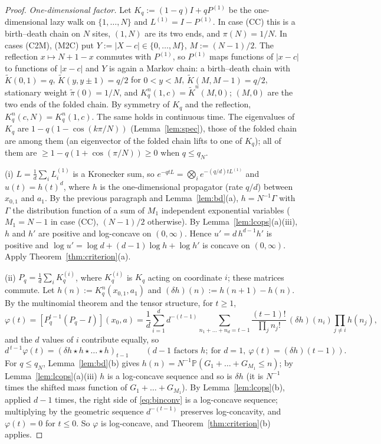 \documentclass[11pt,a4paper]{article}
\theoremstyle{definition}
\newcommand{\Prob}{\mathbb P}
\begin{document}
\begin{proof}
\emph{One-dimensional factor.} Let $K_q:=(1-q)I+qP^{(1)}$ be the one-dimensional lazy walk on $\{1,\dots,N\}$ and $L^{(1)}=I-P^{(1)}$. In case (CC) this is a birth--death chain on $N$ sites, $(1,N)$ are its two ends, and $\pi(N)=1/N$. In cases (C2M), (M2C) put $Y:=|X-c|\in\{0,\dots,M\}$, $M:=(N-1)/2$. The reflection $x\mapsto N+1-x$ commutes with $P^{(1)}$, so $P^{(1)}$ maps functions of $|x-c|$ to functions of $|x-c|$ and $Y$ is again a Markov chain: a birth--death chain with $\tilde K(0,1)=q$, $\tilde K(y,y\pm1)=q/2$ for $0<y<M$, $\tilde K(M,M-1)=q/2$, stationary weight $\tilde\pi(0)=1/N$, and $K_q^n(1,c)=\tilde K^n(M,0)$; $(M,0)$ are the two ends of the folded chain. By symmetry of $K_q$ and the reflection, $K_q^n(c,N)=K_q^n(1,c)$. The same holds in continuous time. The eigenvalues of $K_q$ are $1-q(1-\cos(k\pi/N))$ (Lemma~\ref{lem:spec}), those of the folded chain are among them (an eigenvector of the folded chain lifts to one of $K_q$); all of them are $\ge1-q(1+\cos(\pi/N))\ge0$ when $q\le q_N$.

(i) $L=\frac1d\sum_iL^{(1)}_i$ is a Kronecker sum, so $e^{-qtL}=\bigotimes_ie^{-(q/d)tL^{(1)}}$ and $u(t)=h(t)^d$, where $h$ is the one-dimensional propagator (rate $q/d$) between $x_{0,1}$ and $a_1$. By the previous paragraph and Lemma~\ref{lem:bd}(a), $h=N^{-1}\Gamma$ with $\Gamma$ the distribution function of a sum of $M_1$ independent exponential variables ($M_1=N-1$ in case (CC), $(N-1)/2$ otherwise). By Lemma~\ref{lem:lcops}(a)(iii), $h$ and $h'$ are positive and log-concave on $(0,\infty)$. Hence $u'=d\,h^{d-1}h'$ is positive and $\log u'=\log d+(d-1)\log h+\log h'$ is concave on $(0,\infty)$. Apply Theorem~\ref{thm:criterion}(a).

(ii) $P_q=\frac1d\sum_iK_q^{(i)}$, where $K_q^{(i)}$ is $K_q$ acting on coordinate $i$; these matrices commute. Let $h(n):=K_q^n(x_{0,1},a_1)$ and $(\delta h)(n):=h(n+1)-h(n)$. By the multinomial theorem and the tensor structure, for $t\ge1$,
\[
\varphi(t)=[P_q^{t-1}(P_q-I)](x_0,a)=\frac1d\sum_{i=1}^dd^{-(t-1)}\sum_{n_1+\dots+n_d=t-1}\frac{(t-1)!}{\prod_jn_j!}\,(\delta h)(n_i)\prod_{j\ne i}h(n_j),
\]
and the $d$ values of $i$ contribute equally, so
\begin{equation}\label{eq:binconv}
d^{\,t-1}\varphi(t)=(\delta h\star h\star\dots\star h)_{t-1}\qquad(d-1\text{ factors }h;\ \text{for }d=1,\ \varphi(t)=(\delta h)(t-1)).
\end{equation}
For $q\le q_N$, Lemma~\ref{lem:bd}(b) gives $h(n)=N^{-1}\Prob(G_1+\dots+G_{M_1}\le n)$; by Lemma~\ref{lem:lcops}(a)(iii) $h$ is a log-concave sequence and so is $\delta h$ (it is $N^{-1}$ times the shifted mass function of $G_1+\dots+G_{M_1}$). By Lemma~\ref{lem:lcops}(b), applied $d-1$ times, the right side of \eqref{eq:binconv} is a log-concave sequence; multiplying by the geometric sequence $d^{-(t-1)}$ preserves log-concavity, and $\varphi(t)=0$ for $t\le0$. So $\varphi$ is log-concave, and Theorem~\ref{thm:criterion}(b) applies.
\end{proof}
\end{document}
